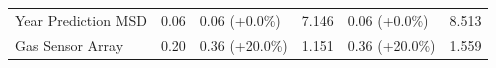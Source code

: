 \documentclass{article}
\begin{document}
\begin{table}[h]
\begin{tabular}{@{}llllll@{}}
Year Prediction MSD   & 0.06                              & 0.06 (+0.0\%)                                   & 7.146                                  & 0.06 (+0.0\%)                                   & 8.513                                  \\
Gas Sensor Array      & 0.20                              & 0.36 (+20.0\%)                                  & 1.151                                  & 0.36 (+20.0\%)                                  & 1.559                                  \\ \bottomrule
\end{tabular}\\
\label{tbl3}
\end{table}
\end{document}
